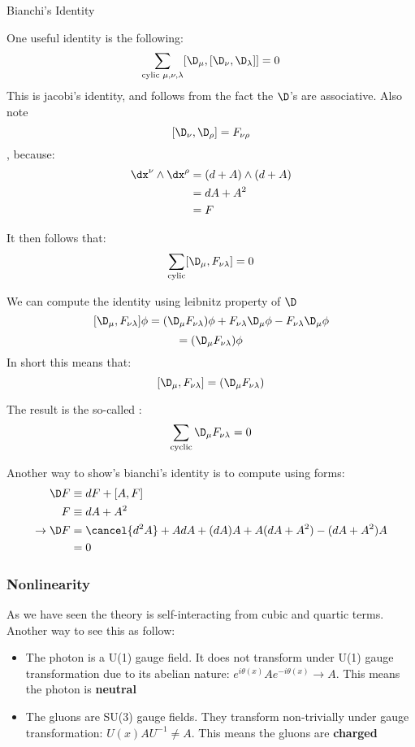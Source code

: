 \documentclass[11pt]{scrartcl}
\begin{document}
\begin{example}{Bianchi's Identity}
	
One useful identity is the following:
\[ \sum_{\text{cylic } \mu, \nu, \lambda} [\D_\mu, [\D_\nu, \D_\lambda]]  = 0 \]
This is jacobi's identity, and follows from the fact the $\D$'s are associative.
Also note \[ [\D_{\nu}, \D_{\rho}] =  F_{\nu \rho} \], because:
	\begin{align*}
		[\D_{\nu}, \D_{\rho}] \dx^\nu \wedge \dx^\rho &= (d + A) \wedge (d + A) \\
		& = d A + A^2  \\
		& = F
		\end{align*}

It then follows that:
\[\sum_{\text{cylic}}  [\D_\mu, F_{\nu \lambda}] = 0 \]

We can compute the identity using leibnitz property of $\D$
\[ [\D_\mu, F_{\nu \lambda}]  \phi = (\D_\mu F_{\nu \lambda}) \phi + F_{\nu \lambda} \D_\mu \phi - F_{\nu \lambda} \D_\mu \phi  \]
\[ = (\D_\mu F_{\nu \lambda}) \phi  \]
In short this means that:
\[ [\D_\mu, F_{\nu \lambda}] = (\D_\mu F_{\nu \lambda}) \]

The result is the so-called :
\[ \sum_{\text{cyclic}} \D_\mu F_{\nu \lambda} = 0 \]

Another way to show's bianchi's identity is to compute using forms:
\begin{align*}
	\D F & \equiv d F + [A, F] \\
	F &\equiv dA + A^2 \\
	\rightarrow \D F &  = \cancel{d^2 A} + A dA + (dA)A + A (dA + A^2) - (dA + A^2) A \\
	&= 0
	\end{align*}

\end{example}

\subsubsection{Nonlinearity}

As we have seen the theory is self-interacting from cubic and quartic terms.  Another way to see this as follow:
\begin{itemize}
	\item The photon is a U(1) gauge field.  It does not transform under U(1) gauge transformation due to its abelian nature:
	$e^{i \theta(x)} A e^{-i \theta(x)} \rightarrow A$.
	This means the photon is \textbf{neutral}
	\item The gluons are SU(3) gauge fields.  They transform non-trivially under gauge transformation:
	$U(x) A U^{-1} \neq A$. 
	This means the gluons are \textbf{charged}
\end{itemize}
\end{document}
